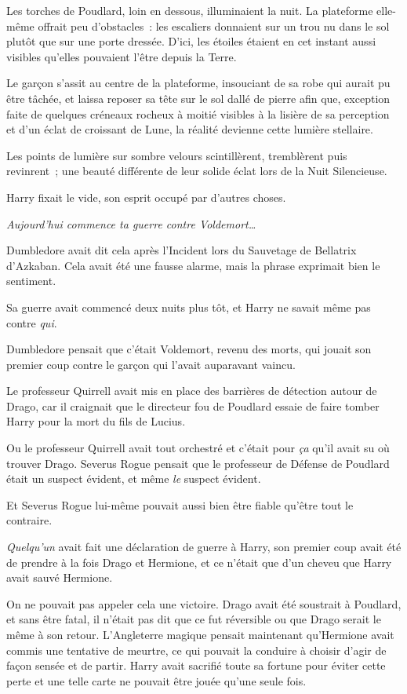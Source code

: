 Les torches de Poudlard, loin en dessous, illuminaient la nuit.
La plateforme elle-même offrait peu d'obstacles~: les escaliers donnaient sur un trou nu dans le sol plutôt que sur une porte dressée.
D'ici, les étoiles étaient en cet instant aussi visibles qu'elles pouvaient l'être depuis la Terre.

Le garçon s'assit au centre de la plateforme, insouciant de sa robe qui aurait pu être tâchée, et laissa reposer sa tête sur le sol dallé de pierre afin que, exception faite de quelques créneaux rocheux à moitié visibles à la lisière de sa perception et d'un éclat de croissant de Lune, la réalité devienne cette lumière stellaire.

Les points de lumière sur sombre velours scintillèrent, tremblèrent puis revinrent~; une beauté différente de leur solide éclat lors de la Nuit Silencieuse.

Harry fixait le vide, son esprit occupé par d'autres choses.

\emph{Aujourd'hui commence ta guerre contre Voldemort…}

Dumbledore avait dit cela après l'Incident lors du Sauvetage de Bellatrix d'Azkaban.
Cela avait été une fausse alarme, mais la phrase exprimait bien le sentiment.

Sa guerre avait commencé deux nuits plus tôt, et Harry ne savait même pas contre \emph{qui}.

Dumbledore pensait que c'était Voldemort, revenu des morts, qui jouait son premier coup contre le garçon qui l'avait auparavant vaincu.

Le professeur Quirrell avait mis en place des barrières de détection autour de Drago, car il craignait que le directeur fou de Poudlard essaie de faire tomber Harry pour la mort du fils de Lucius.

Ou le professeur Quirrell avait tout orchestré et c'était pour \emph{ça} qu'il avait su où trouver Drago.
Severus Rogue pensait que le professeur de Défense de Poudlard était un suspect évident, et même \emph{le} suspect évident.

Et Severus Rogue lui-même pouvait aussi bien être fiable qu'être tout le contraire.

\emph{Quelqu'un} avait fait une déclaration de guerre à Harry, son premier coup avait été de prendre à la fois Drago et Hermione, et ce n'était que d'un cheveu que Harry avait sauvé Hermione.

On ne pouvait pas appeler cela une victoire.
Drago avait été soustrait à Poudlard, et sans être fatal, il n'était pas dit que ce fut réversible ou que Drago serait le même à son retour.
L'Angleterre magique pensait maintenant qu'Hermione avait commis une tentative de meurtre, ce qui pouvait la conduire à choisir d'agir de façon sensée et de partir.
Harry avait sacrifié toute sa fortune pour éviter cette perte et une telle carte ne pouvait être jouée qu'une seule fois.

